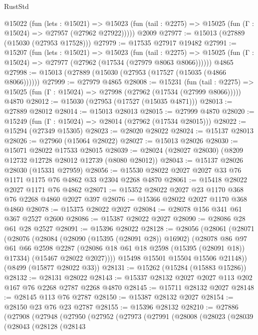 \begin{lexlean}{RustStd}
\begin{coremodule}
    @15022
      (fun (lets : @15021) =>
      @15023 (fun (tail : @2275) => @15025 (fun (Γ : @15024) => @27957 (@27962 @27922)))))
    @2009
@27977 := @15013 (@27889 (@15030 (@27953 @17528)))
@27979 := @17535 @27917 @19482
@27991 := @15207
    (fun (lets : @15021) =>
    @15023
      (fun (tail : @2275) =>
      @15025 (fun (Γ : @15024) => @27977 (@27962 (@17534 (@27979 @8063 @8066))))))
    @4865
@27998 := @15013 (@27889 (@15030 (@27953 (@17527 (@15035 (@4866 @8066))))))
@27999 := @27979 @4865
@28008 := @15231
    (fun (tail : @2275) => @15025 (fun (Γ : @15024) => @27998 (@27962 (@17534 (@27999 @8066)))))
    @4870
@28012 := @15030 (@27953 (@17527 (@15035 @4871)))
@28013 := @27889 @28012
@28014 := @15013 @28013
@28015 := @27999 @4870
@28020 := @15249 (fun (Γ : @15024) => @28014 (@27962 (@17534 @28015)))
@28022 := @15294 (@27349 @15305)
@28023 := @28020 @28022
@28024 := @15137 @28013
@28026 := @27960 (@15064 @28022)
@28027 := @15013 @28026
@28030 := @15071 @28022 @17533 @28015
@28039 := @28024 (@28027 @28030) (@8209 @12732 @12728 @28012 @12739 (@8080 @28012))
@28043 := @15137 @28026 @28030 (@15331 @27959)
@28056 := @15530 @28022 @2027 @2027 @33 @76 @1171 @1175 @76 @4862 @33 @2304 @2268 @4870
@28061 := @15418 @28022 @2027 @1171 @76 @4862
@28071 := @15352 @28022 @2027 @23 @1170 @368 @76 @2268 @4860 @2027 @397
@28076 := @15366 @28022 @2027 @1170 @368 @4860
@28078 := @15375 @28022 @2027
@28084 := @28078 @156 @341 @61 @367 @2527 @2600
@28086 := @15387 @28022 @2027
@28090 := @28086 @28 @61 @28 @2527
@28091 := @15396 @28022
@28128 := @28056
    (@28061
      (@28071
        (@28076
          (@28084
            (@28090 (@15395 (@28091 @28)) @16902)
            (@28078
              @86
              @97
              @61
              @66
              @2598
              @2287
              (@28086 @18 @61 @18 @2598 (@15395 (@28091 @18)) @17334)
              (@15467 @28022 @2027))))
        @15498
        @15501
        @15504
        @15506
        @21148))
    (@8499 (@15877 @28022 @33))
@28131 := @15262 (@15284 (@15883 @15286))
@28132 := @28131 @28022
@28143 := @15337 @28132 @2027 @2027 @113 @202 @167 @76 @2268 @2787 @2268 @4870
@28145 := @15711 @28132 @2027
@28148 := @28145 @113 @76 @2787
@28150 := @15387 @28132 @2027
@28154 := @28150 @23 @76 @23 @2787
@28155 := @15396 @28132
@28210 := @27886
    (@27908
      (@27948
        (@27950
          (@27952
            (@27973
              (@27991
                (@28008
                  (@28023
                    (@28039
                      (@28043
                        (@28128
                          (@28143

\end{coremodule}
\end{lexlean}
